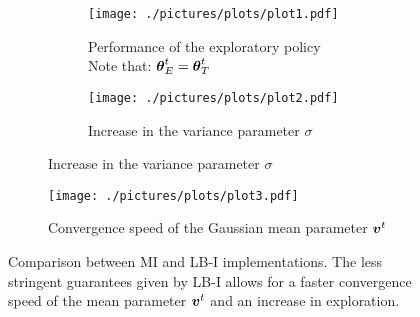 \begin{figure}[t]
\centering
\begin{subfigure}[t]{\textwidth}
\begin{subfigure}[t]{0.5\textwidth}
\texttt{[image: ./pictures/plots/plot1.pdf]}
\caption{Performance of the exploratory policy \\Note that: ${\boldsymbol{\theta}}^t_E = {\boldsymbol{\theta}}^t_T$} \label{fig:plot1-1}
\end{subfigure}
\hfill
\begin{subfigure}[t]{0.5\textwidth}
\texttt{[image: ./pictures/plots/plot2.pdf]}
\caption{Increase in the variance parameter $\sigma$} \label{fig:plot1-2}
\end{subfigure}
\end{subfigure}
\begin{subfigure}[t]{0.5\textwidth}
\texttt{[image: ./pictures/plots/plot3.pdf]}
\caption{Convergence speed of the Gaussian mean parameter $\boldsymbol{v}^t$} \label{fig:plot1-3}
\end{subfigure}
\caption{Comparison between MI and LB-I implementations. The less stringent guarantees given by LB-I allows for a faster convergence speed of the mean parameter $\boldsymbol{v}^t$ and an increase in exploration. }
\label{fig:plot1}
\end{figure}

